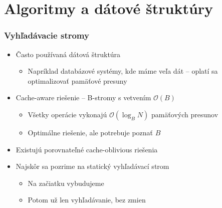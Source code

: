 \documentclass{beamer}
\newcommand{\bigO}{\ensuremath{\mathcal{O}}}
\begin{document}
\section{Algoritmy a dátové štruktúry}
\begin{frame}
    \frametitle{Vyhľadávacie stromy}
    \begin{itemize}
        \item Často používaná dátová štruktúra
        \begin{itemize}
            \item Napríklad databázové systémy, kde máme veľa dát -- oplatí sa optimalizovať pamäťové presuny
        \end{itemize}
        \item Cache-aware riešenie -- B-stromy s vetvením $\bigO(B)$
        \begin{itemize}
            \item Všetky operácie vykonajú $\bigO(\log_B N)$ pamäťových presunov
            \item Optimálne riešenie, ale potrebuje poznať $B$
        \end{itemize}
        \item Existujú porovnateľné cache-oblivious riešenia
        \item Najskôr sa pozrime na statický vyhľadávací strom
        \begin{itemize}
            \item Na začiatku vybudujeme
            \item Potom už len vyhľadávanie, bez zmien
        \end{itemize}
    \end{itemize}
\end{frame}
\end{document}
